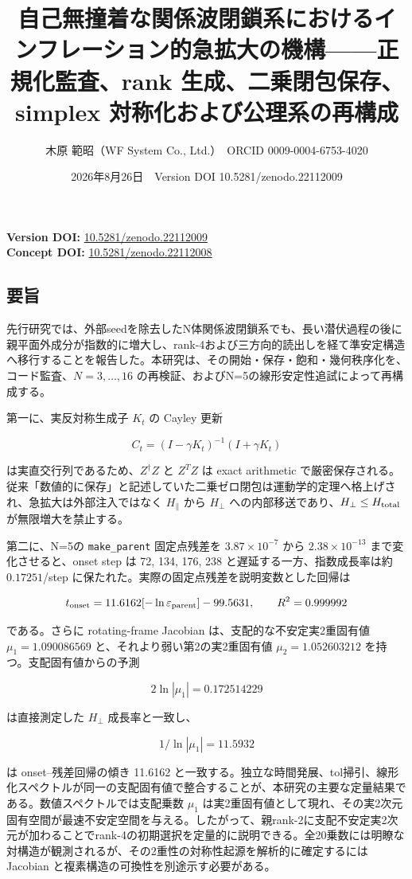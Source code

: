 \documentclass[
  a4paper,
]{ltjsarticle}
\title{自己無撞着な関係波閉鎖系におけるインフレーション的急拡大の機構------正規化監査、rank
生成、二乗閉包保存、simplex 対称化および公理系の再構成}
\author{木原 範昭（WF System Co., Ltd.）　ORCID 0009-0004-6753-4020}
\date{2026年8月26日　Version DOI 10.5281/zenodo.22112009}
\begin{document}
\maketitle

\textbf{Version DOI:}
\href{https://doi.org/10.5281/zenodo.22112009}{10.5281/zenodo.22112009}\\
\textbf{Concept DOI:}
\href{https://doi.org/10.5281/zenodo.22112008}{10.5281/zenodo.22112008}

\subsection{要旨}\label{ux8981ux65e8}

先行研究では、外部seedを除去したN体関係波閉鎖系でも、長い潜伏過程の後に親平面外成分が指数的に増大し、rank-4および三方向的読出しを経て準安定構造へ移行することを報告した。本研究は、その開始・保存・飽和・幾何秩序化を、コード監査、\(N=3,\ldots,16\)
の再検証、およびN=5の線形安定性追試によって再構成する。

第一に、実反対称生成子 \(K_t\) の Cayley 更新

\[
C_t=(I-\gamma K_t)^{-1}(I+\gamma K_t)
\]

は実直交行列であるため、\(Z^\dagger Z\) と \(Z^T Z\) は exact arithmetic
で厳密保存される。従来「数値的に保存」と記述していた二乗ゼロ閉包は運動学的定理へ格上げされ、急拡大は外部注入ではなく
\(H_\parallel\) から \(H_\perp\)
への内部移送であり、\(H_\perp\le H_{\rm total}\) が無限増大を禁止する。

第二に、N=5の \texttt{make\_parent} 固定点残差を \(3.87\times10^{-7}\)
から \(2.38\times10^{-13}\) まで変化させると、onset step は 72, 134,
176, 238 と遅延する一方、指数成長率は約 \(0.17251\)/step
に保たれた。実際の固定点残差を説明変数とした回帰は

\[
t_{\rm onset}=11.6162[-\ln\varepsilon_{\rm parent}]-99.5631,
\qquad R^2=0.999992
\]

である。さらに rotating-frame Jacobian は、支配的な不安定実2重固有値
\(\mu_1=1.090086569\) と、それより弱い第2の実2重固有値
\(\mu_2=1.052603212\) を持つ。支配固有値からの予測

\[
2\ln|\mu_1|=0.172514229
\]

は直接測定した \(H_\perp\) 成長率と一致し、

\[
1/\ln|\mu_1|=11.5932
\]

は onset--残差回帰の傾き 11.6162
と一致する。独立な時間発展、tol掃引、線形化スペクトルが同一の支配固有値で整合することが、本研究の主要な定量結果である。数値スペクトルでは支配乗数
\(\mu_1\)
は実2重固有値として現れ、その実2次元固有空間が最速不安定空間を与える。したがって、親rank-2に支配不安定実2次元が加わることでrank-4の初期選択を定量的に説明できる。全20乗数には明瞭な対構造が観測されるが、その2重性の対称性起源を解析的に確定するには
Jacobian と複素構造の可換性を別途示す必要がある。
\end{document}
